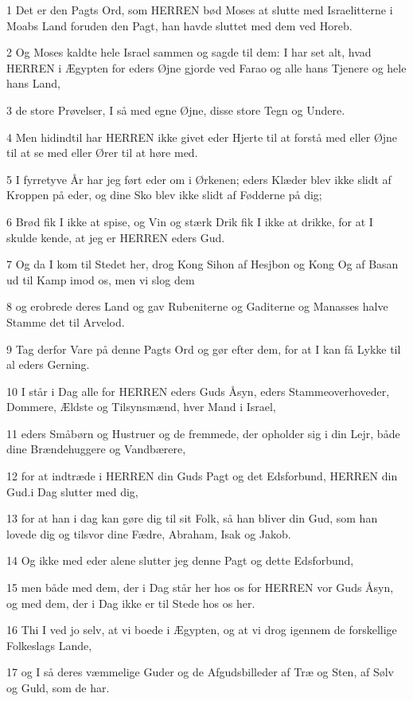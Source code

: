 \par 1 Det er den Pagts Ord, som HERREN bød Moses at slutte med Israelitterne i Moabs Land foruden den Pagt, han havde sluttet med dem ved Horeb.
\par 2 Og Moses kaldte hele Israel sammen og sagde til dem: I har set alt, hvad HERREN i Ægypten for eders Øjne gjorde ved Farao og alle hans Tjenere og hele hans Land,
\par 3 de store Prøvelser, I så med egne Øjne, disse store Tegn og Undere.
\par 4 Men hidindtil har HERREN ikke givet eder Hjerte til at forstå med eller Øjne til at se med eller Ører til at høre med.
\par 5 I fyrretyve År har jeg ført eder om i Ørkenen; eders Klæder blev ikke slidt af Kroppen på eder, og dine Sko blev ikke slidt af Fødderne på dig;
\par 6 Brød fik I ikke at spise, og Vin og stærk Drik fik I ikke at drikke, for at I skulde kende, at jeg er HERREN eders Gud.
\par 7 Og da I kom til Stedet her, drog Kong Sihon af Hesjbon og Kong Og af Basan ud til Kamp imod os, men vi slog dem
\par 8 og erobrede deres Land og gav Rubeniterne og Gaditerne og Manasses halve Stamme det til Arvelod.
\par 9 Tag derfor Vare på denne Pagts Ord og gør efter dem, for at I kan få Lykke til al eders Gerning.
\par 10 I står i Dag alle for HERREN eders Guds Åsyn, eders Stammeoverhoveder, Dommere, Ældste og Tilsynsmænd, hver Mand i Israel,
\par 11 eders Småbørn og Hustruer og de fremmede, der opholder sig i din Lejr, både dine Brændehuggere og Vandbærere,
\par 12 for at indtræde i HERREN din Guds Pagt og det Edsforbund, HERREN din Gud.i Dag slutter med dig,
\par 13 for at han i dag kan gøre dig til sit Folk, så han bliver din Gud, som han lovede dig og tilsvor dine Fædre, Abraham, Isak og Jakob.
\par 14 Og ikke med eder alene slutter jeg denne Pagt og dette Edsforbund,
\par 15 men både med dem, der i Dag står her hos os for HERREN vor Guds Åsyn, og med dem, der i Dag ikke er til Stede hos os her.
\par 16 Thi I ved jo selv, at vi boede i Ægypten, og at vi drog igennem de forskellige Folkeslags Lande,
\par 17 og I så deres væmmelige Guder og de Afgudsbilleder af Træ og Sten, af Sølv og Guld, som de har.
